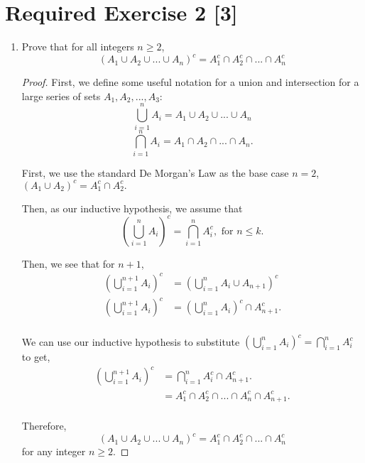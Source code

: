 \documentclass{article}
\begin{document}
\section*{Required Exercise 2 [3]}

\begin{enumerate}
    \item {
        Prove that for all integers \(n \ge 2\), 
        \[\left( A_1 \cup A_2 \cup ... \cup A_n \right)^c = A_1^c \cap A_2^c \cap ... \cap A_n^c \]

        \begin{proof}
            First, we define some useful notation for a union and intersection
            for a large series of sets \(A_1, A_2, ..., A_3\):
            \[ \bigcup_{i=1}^{n} A_i = A_1 \cup A_2 \cup ... \cup A_n\]
            \[ \bigcap_{i=1}^{n} A_i = A_1 \cap A_2 \cap ... \cap A_n.\]

            First, we use the standard De Morgan's Law as the base case \(n=2\),
            \(\left( A_1 \cup A_2 \right)^c = A_1^c \cap A_2^c.\)

            Then, as our inductive hypothesis, we assume that 
            \[ \left( \bigcup_{i=1}^{n} A_i \right)^c = \bigcap_{i=1}^{n} A_i^c, \text{ for } n \le k.\]

            Then, we see that for \(n+1\), 
            \begin{align*}
                \left( \bigcup_{i=1}^{n+1} A_i \right)^c &= \left( \bigcup_{i=1}^{n} A_i \cup A_{n+1} \right)^c \\
                \left( \bigcup_{i=1}^{n+1} A_i \right)^c &= \left( \bigcup_{i=1}^{n} A_i \right)^c \cap A_{n+1}^c .\\
            \end{align*}

            We can use our inductive hypothesis to substitute 
            \(\left( \bigcup_{i=1}^{n} A_i \right)^c = \bigcap_{i=1}^{n} A_i^c\)
            to get,
            \begin{align*}
                \left( \bigcup_{i=1}^{n+1} A_i \right)^c &= \bigcap_{i=1}^{n} A_i^c \cap A_{n+1}^c .\\
                &= A_1^c \cap A_2^c \cap ... \cap A_n^c \cap A_{n+1}^c .\\
            \end{align*}

            Therefore, 
            \[\left( A_1 \cup A_2 \cup ... \cup A_n \right)^c = A_1^c \cap A_2^c \cap ... \cap A_n^c \]
            for any integer \(n \ge 2\).
        \end{proof}
    }


\end{enumerate}
\end{document}
